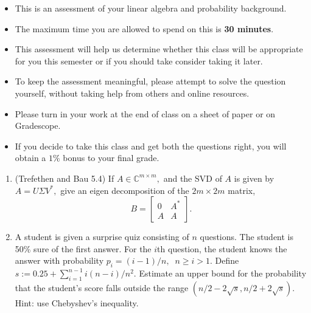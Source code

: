 \documentclass[12pt]{article}
\begin{document}
\MakeScribeTop

\begin{itemize}
	\item This is an assessment of your linear algebra and probability background.
	\item The maximum time you are allowed to spend on this is \textbf{30 minutes}.
	\item This assessment will help us determine whether this class will be appropriate for you this semester or if you should take consider taking it later.
	\item To keep the assessment meaningful, please attempt to solve the question yourself, without taking help from others and online resources.
	\item Please turn in your work at the end of class on a sheet of paper or on Gradescope. 
	\item If you decide to take this class and get both the questions right, you will obtain a $1\%$ bonus to your final grade.
\end{itemize}
\vspace{1in}
\begin{enumerate}
	\item (Trefethen and Bau 5.4) If $A \in \mathbb{C}^{m\times m},$ and the SVD of $A$ is given by $A = U \Sigma V^*,$ give an eigen decomposition of the $2m \times 2m$ matrix,
		\begin{equation}
		B = \begin{bmatrix}
		0 & A^* \\
		A & A
		\end{bmatrix}.
		\end{equation}
	\item A student is given a surprise quiz consisting of $n$ questions. The student is 50\% sure of the first answer. For the $i$th question, the student knows the answer with probability $p_i = (i-1)/n,\;\; n \geq i > 1.$ Define $s := 0.25 + \sum_{i=1}^{n-1} i(n-i)/n^2.$ Estimate an upper bound for the probability that the student's score falls outside the range $(n/2 - 2\sqrt{s}, n/2 + 2\sqrt{s})$. Hint: use Chebyshev's inequality. 
\end{enumerate}



\end{document}
